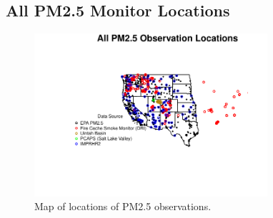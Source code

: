 
\subsection{All PM2.5 Monitor Locations}
\begin{figure} 
\centering 
\includegraphics[width=0.77\textwidth]{Code_Outputs/MapPM25_All_Sites.pdf} 
\caption{\label{fig:MapPM25Loc}Map of locations of PM2.5 observations.} 
\end{figure} 
 
